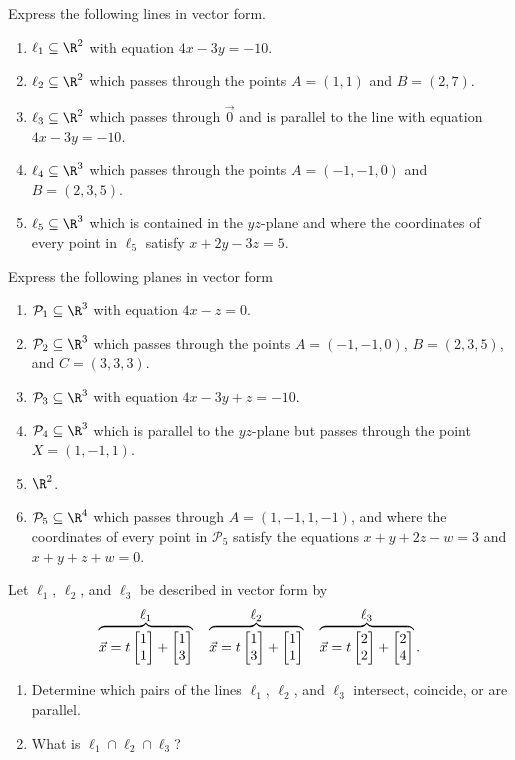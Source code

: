 \begin{exercises}
	\begin{problist}
		\prob  Express the following lines in vector form.
		\begin{enumerate}
			\item   $\ell_1\subseteq\R^2$ with equation $4x-3y=-10$.
			\item   $\ell_2\subseteq\R^2$ which passes through the points $A=(1,1)$ and $B=(2,7)$.
			\item   $\ell_3\subseteq\R^2$ which passes through $\vec 0$ and is parallel to the line
				with equation $4x-3y=-10$.
			\item   $\ell_4\subseteq\R^3$ which passes through the points $A=(-1,-1,0)$ and $B=(2,3,5)$.
			\item   $\ell_5\subseteq\R^3$ which is contained in the $yz$-plane and where the coordinates
				of every point in $\ell_5$ satisfy $x+2y-3z=5$.
		\end{enumerate}
		\prob Express the following planes in vector form
		\begin{enumerate}
			\item   $\mathcal P_1\subseteq\R^3$ with equation $4x-z=0$.
			\item   $\mathcal P_2\subseteq\R^3$ which passes through the points $A=(-1,-1,0)$, $B=(2,3,5)$, and $C=(3,3,3)$.
			\item   $\mathcal P_3\subseteq\R^3$ with equation $4x-3y+z=-10$.
			\item   $\mathcal P_4\subseteq\R^3$ which is parallel to the $yz$-plane but passes through the point $X=(1,-1,1)$.
			\item   $\R^2$.
			\item   $\mathcal P_5\subseteq\R^4$ which passes through $A=(1,-1,1,-1)$,
				and where the coordinates of every point in $\mathcal P_5$ satisfy the equations $x+y+2z-w=3$
				and $x+y+z+w=0$.
		\end{enumerate}
		\prob Let $\ell_1$, $\ell_2$, and $\ell_3$ be described in vector form by
		\[
			\overbrace{\vec x=t\mat{1\\1}+\mat{1\\3}}^{\displaystyle \ell_1}
			\quad
			\overbrace{\vec x=t\mat{1\\3}+\mat{1\\1}}^{\displaystyle \ell_2}
			\quad
			\overbrace{\vec x=t\mat{2\\2}+\mat{2\\4}}^{\displaystyle \ell_3}.
		\]
		\begin{enumerate}
			\item
				Determine which pairs of the lines $\ell_1$, $\ell_2$, and $\ell_3$ intersect, 
				coincide, or are parallel.
			\item What is $\ell_1\cap\ell_2\cap\ell_3$?
		\end{enumerate}


\end{problist}
\end{exercises}
